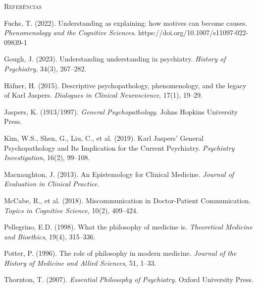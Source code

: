 \vspace{2em}
\begin{small}
\noindent\textsc{Referências}

\vspace{1em}
\noindent Fuchs, T. (2022). Understanding as explaining: how motives can become causes. \textit{Phenomenology and the Cognitive Sciences}. https://doi.org/10.1007/s11097-022-09839-1

\noindent Gough, J. (2023). Understanding understanding in psychiatry. \textit{History of Psychiatry}, 34(3), 267--282.

\noindent Häfner, H. (2015). Descriptive psychopathology, phenomenology, and the legacy of Karl Jaspers. \textit{Dialogues in Clinical Neuroscience}, 17(1), 19--29.

\noindent Jaspers, K. (1913/1997). \textit{General Psychopathology}. Johns Hopkins University Press.

\noindent Kim, W.S., Shen, G., Liu, C., et al. (2019). Karl Jaspers' General Psychopathology and Its Implication for the Current Psychiatry. \textit{Psychiatry Investigation}, 16(2), 99--108.

\noindent Macnaughton, J. (2013). An Epistemology for Clinical Medicine. \textit{Journal of Evaluation in Clinical Practice}.

\noindent McCabe, R., et al. (2018). Miscommunication in Doctor-Patient Communication. \textit{Topics in Cognitive Science}, 10(2), 409--424.

\noindent Pellegrino, E.D. (1998). What the philosophy of medicine is. \textit{Theoretical Medicine and Bioethics}, 19(4), 315--336.

\noindent Potter, P. (1996). The role of philosophy in modern medicine. \textit{Journal of the History of Medicine and Allied Sciences}, 51, 1--33.

\noindent Thornton, T. (2007). \textit{Essential Philosophy of Psychiatry}. Oxford University Press.
\end{small}
